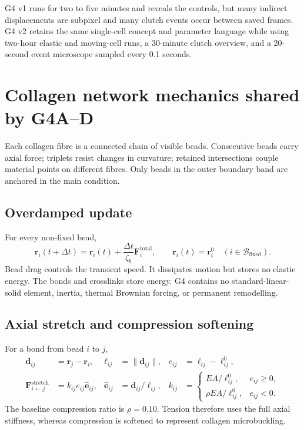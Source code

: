\documentclass[10.5pt]{article}
\newcommand{\rv}{\mathbf r}
\newcommand{\Fv}{\mathbf F}
\newcommand{\ev}{\widehat{\mathbf e}}
\begin{document}
G4 v1 runs for two to five minutes and reveals the controls, but many indirect displacements are
subpixel and many clutch events occur between saved frames. G4 v2 retains the same single-cell
concept and parameter language while using two-hour elastic and moving-cell runs, a 30-minute
clutch overview, and a 20-second event microscope sampled every 0.1 seconds.

\section{Collagen network mechanics shared by G4A--D}

Each collagen fibre is a connected chain of visible beads. Consecutive beads carry axial force;
triplets resist changes in curvature; retained intersections couple material points on different
fibres. Only beads in the outer boundary band are anchored in the main condition.

\subsection{Overdamped update}

For every non-fixed bead,
\begin{equation}
 \rv_i(t+\Delta t)=\rv_i(t)+\frac{\Delta t}{\zeta_b}\Fv_i^{\mathrm{total}},
 \qquad \rv_i(t)=\rv_i^0\quad (i\in\mathcal B_{\mathrm{fixed}}).
 \label{eq:euler}
\end{equation}
Bead drag controls the transient speed. It dissipates motion but stores no elastic energy.
The bonds and crosslinks store energy. G4 contains no standard-linear-solid element, inertia,
thermal Brownian forcing, or permanent remodelling.

\subsection{Axial stretch and compression softening}

For a bond from bead $i$ to $j$,
\begin{align}
 \mathbf d_{ij}&=\rv_j-\rv_i, & \ell_{ij}&=\lVert\mathbf d_{ij}\rVert,
 & e_{ij}&=\ell_{ij}-\ell_{ij}^0,\\
 \Fv_{i\leftarrow j}^{\mathrm{stretch}}&=k_{ij}e_{ij}\ev_{ij},
 &\ev_{ij}&=\mathbf d_{ij}/\ell_{ij},
 &k_{ij}&=
 \begin{cases}
 EA/\ell_{ij}^0,&e_{ij}\ge 0,\\
 \rho EA/\ell_{ij}^0,&e_{ij}<0.
 \end{cases}
 \label{eq:stretch}
\end{align}
The baseline compression ratio is $\rho=0.10$. Tension therefore uses the full axial stiffness,
whereas compression is softened to represent collagen microbuckling.
\end{document}
